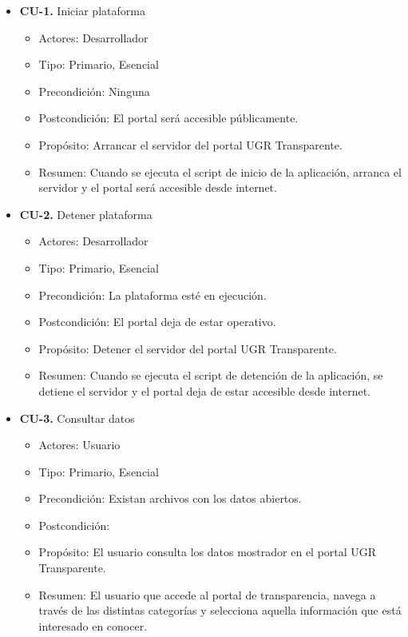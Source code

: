 \begin{itemize}
  \item \textbf{CU-1.} Iniciar plataforma
  \begin{itemize}
    \item Actores: Desarrollador
    \item Tipo: Primario, Esencial
    \item Precondición: Ninguna
    \item Postcondición: El portal será accesible públicamente.
    \item Propósito: Arrancar el servidor del portal UGR Transparente.
    \item Resumen: Cuando se ejecuta el script de inicio de la aplicación, arranca el servidor y el portal será accesible desde
    internet.
  \end{itemize}
 
  \item \textbf{CU-2.} Detener plataforma
  \begin{itemize}
    \item Actores: Desarrollador
    \item Tipo: Primario, Esencial
    \item Precondición: La plataforma esté en ejecución.
    \item Postcondición: El portal deja de estar operativo.
    \item Propósito: Detener el servidor del portal UGR Transparente.
    \item Resumen: Cuando se ejecuta el script de detención de la aplicación, se detiene el servidor y el portal deja de estar
    accesible desde internet.
  \end{itemize}
 
  \newpage
  \item \textbf{CU-3.} Consultar datos
  \begin{itemize}
    \item Actores: Usuario
    \item Tipo: Primario, Esencial
    \item Precondición: Existan archivos con los datos abiertos.
    \item Postcondición:
    \item Propósito: El usuario consulta los datos mostrador en el portal UGR Transparente.
    \item Resumen: El usuario que accede al portal de transparencia, navega a través de las distintas categorías y selecciona
    aquella información que está interesado en conocer.
  \end{itemize}
 

\end{itemize}

